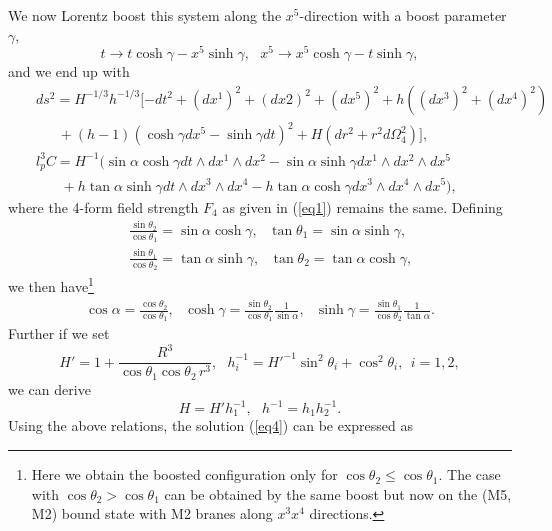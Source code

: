 \documentclass[a4paper,12pt]{article}
\begin{document}
We now Lorentz boost this system along the  $x^5$-direction with 
a boost parameter $\gamma$,
\begin{equation}
\label{eq3}
t \to t \cosh\gamma -x^5 \sinh\gamma, \ \ \  x^5 \to x^5 \cosh\gamma 
-t\sinh\gamma,
\end{equation}
and we end up with
\begin{eqnarray}
\label{eq4}
&& ds^2 = H^{-1/3}h^{-1/3}[-dt^2 +(dx^1)^2 +(dx2)^2 +(dx^5)^2 +h((dx^3)^2 
   +(dx^4)^2)
    \nonumber \\
&& ~~~~~~~ +(h-1)(\cosh\gamma dx^5 -\sinh\gamma dt)^2 +
     H(dr^2 +r^2 d\Omega_4^2)],
    \nonumber \\ 
&& l_p^3 C= H^{-1}(\sin\alpha \cosh\gamma dt\wedge dx^1 \wedge dx^2
    -\sin\alpha \sinh\gamma dx^1 \wedge dx^2 \wedge dx^5 \nonumber \\
&& ~~~~~~~~ +h\tan\alpha \sinh\gamma dt \wedge dx^3 \wedge dx^4 -h\tan\alpha
    \cosh\gamma dx^3 \wedge dx^4 \wedge dx^5),
\end{eqnarray}
where the 4-form field strength $F_4$ as given in (\ref{eq1}) remains
the same.
Defining
\begin{eqnarray}
\label{eq5}
&& \frac{\sin\theta_2}{\cos\theta_1}= \sin\alpha \cosh\gamma, \ \ \ 
   \tan\theta_1 = \sin\alpha \sinh\gamma, \nonumber \\
&& \frac{\sin\theta_1}{\cos\theta_2}=\tan\alpha \sinh\gamma, \ \ \
   \tan\theta_2 = \tan\alpha \cosh\gamma,
\end{eqnarray}
we then have\footnote{Here we obtain the boosted configuration only for 
$\cos\theta_2 \le \cos\theta_1$. The case with $\cos\theta_2 >
\cos\theta_1$ can be obtained by the same boost but now on the (M5, M2)
bound state with M2 branes along $x^3 x^4$ directions.} 
\begin{eqnarray}
\label{eq6}
\cos\alpha =\frac{\cos\theta_2}{\cos\theta_1}, \ \ \
\cosh\gamma = \frac{\sin\theta_2}{\cos\theta_1}\frac{1}{\sin\alpha}, \ \ \
\sinh\gamma =\frac{\sin\theta_1}{\cos\theta_2}\frac{1}{\tan\alpha}.
\end{eqnarray}
Further if we set
\begin{equation}
\label{eq7}
H'=1+ \frac{R^3}{\cos\theta_1\cos\theta_2\, r^3}, \ \ \
h_i^{-1}= H'^{-1}\sin^2\theta_i +\cos^2\theta_i, \ \ i=1,2,
\end{equation}
we can derive 
\begin{equation}
\label{eq8}
H= H'h_1^{-1}, \ \ \  h^{-1}=h_1 h_2^{-1}.
\end{equation} 
Using the above relations, the solution (\ref{eq4}) can be expressed as
\end{document}
